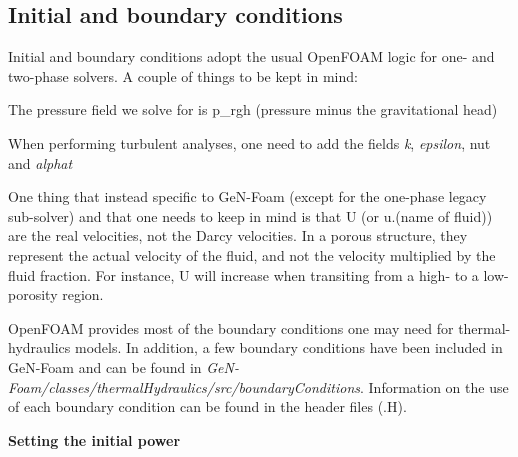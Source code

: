 \subsection*{Initial and boundary conditions}

Initial and boundary conditions adopt the usual Open\+F\+O\+AM logic for one-\/ and two-\/phase solvers. A couple of things to be kept in mind\+: 
\begin{DoxyItemize}
\item The pressure field we solve for is p\+\_\+rgh (pressure minus the gravitational head) 
\item When performing turbulent analyses, one need to add the fields {\itshape k}, {\itshape epsilon}, nut and {\itshape alphat} 
\end{DoxyItemize}

One thing that instead specific to Ge\+N-\/\+Foam (except for the one-\/phase legacy sub-\/solver) and that one needs to keep in mind is that U (or u.(name of fluid)) are the real velocities, not the Darcy velocities. In a porous structure, they represent the actual velocity of the fluid, and not the velocity multiplied by the fluid fraction. For instance, U will increase when transiting from a high-\/ to a low-\/porosity region.

Open\+F\+O\+AM provides most of the boundary conditions one may need for thermal-\/hydraulics models. In addition, a few boundary conditions have been included in Ge\+N-\/\+Foam and can be found in {\itshape Ge\+N-\/\+Foam/classes/thermal\+Hydraulics/src/boundary\+Conditions}. Information on the use of each boundary condition can be found in the header files (.H).

 {\bfseries Setting the initial power}

